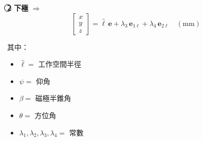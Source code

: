 \documentclass[12pt]{article}
\begin{document}
\textbf{\textcircled{2} 下極} $\Rightarrow$
\[
\begin{bmatrix} x \\ y \\ z \end{bmatrix}
= \hat{\ell}\,\mathbf{e} + \lambda_3\,\mathbf{e}_{1\ell} + \lambda_4\,\mathbf{e}_{2\ell}
\quad (\mathrm{mm})
\]

\vspace{6pt}
其中：
\begin{itemize}
\item $\hat{\ell} = $ 工作空間半徑
\item $\psi = $ 仰角
\item $\beta = $ 磁極半錐角
\item $\theta = $ 方位角
\item $\lambda_1,\lambda_2,\lambda_3,\lambda_4 = $ 常數
\end{itemize}
\end{document}
